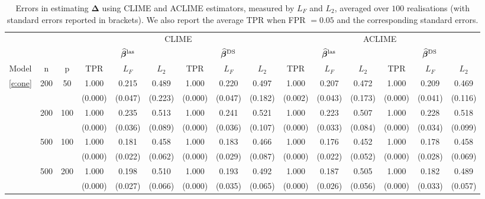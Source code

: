 \begin{table}[htbp]
\caption{Errors in estimating $\bm\Delta$ using CLIME and ACLIME estimators, measured by $L_F$ and $L_2$, averaged over $100$ realisations (with standard errors reported in brackets).
We also report the average TPR when FPR $= 0.05$ and the corresponding standard errors.} 
\label{table:lrpc:delta}
\centering
\resizebox{\columnwidth}{!}
{\scriptsize 
\begin{tabular}{ccc cccccc cccccc}
\toprule 
 &  &  & \multicolumn{6}{c}{CLIME} &  \multicolumn{6}{c}{ACLIME} \\
 \cmidrule(lr){4-9}\cmidrule(lr){10-15}
 &  &  & \multicolumn{3}{c}{$\widehat{\bm\beta}^{\text{\upshape{las}}}$} & \multicolumn{3}{c}{$\widehat{\bm\beta}^{\text{\upshape{DS}}}$} & \multicolumn{3}{c}{$\widehat{\bm\beta}^{\text{\upshape{las}}}$} & \multicolumn{3}{c}{$\widehat{\bm\beta}^{\text{\upshape{DS}}}$}   \\
 \cmidrule(lr){4-6}\cmidrule(lr){7-9} \cmidrule(lr){10-12} \cmidrule(lr){13-15}
Model & n & p & TPR & $L_F$ & $L_2$ & TPR & $L_F$ & $L_2$ & TPR & $L_F$ & $L_2$ & TPR & $L_F$ & $L_2$ \\
\cmidrule(lr){1-3}\cmidrule(lr){4-9} \cmidrule(lr){10-15}
\ref{e:one} & 200 & 50 & 1.000 & 0.215 & 0.489 & 1.000 & 0.220 & 0.497 & 1.000 & 0.207 & 0.472 & 1.000 & 0.209 & 0.469 \\
 &  &  & (0.000) & (0.047) & (0.223) & (0.000) & (0.047) & (0.182) & (0.002) & (0.043) & (0.173) & (0.000) & (0.041) & (0.116) \\
 & 200 & 100 & 1.000 & 0.235 & 0.513 & 1.000 & 0.241 & 0.521 & 1.000 & 0.223 & 0.507 & 1.000 & 0.228 & 0.518 \\
 &  &  & (0.000) & (0.036) & (0.089) & (0.000) & (0.036) & (0.107) & (0.000) & (0.033) & (0.084) & (0.000) & (0.034) & (0.099) \\
 & 500 & 100 & 1.000 & 0.181 & 0.458 & 1.000 & 0.183 & 0.466 & 1.000 & 0.176 & 0.452 & 1.000 & 0.178 & 0.458 \\
 &  &  & (0.000) & (0.022) & (0.062) & (0.000) & (0.029) & (0.087) & (0.000) & (0.022) & (0.052) & (0.000) & (0.028) & (0.069) \\
 & 500 & 200 & 1.000 & 0.198 & 0.510 & 1.000 & 0.193 & 0.492 & 1.000 & 0.187 & 0.505 & 1.000 & 0.182 & 0.489 \\
 &  &  & (0.000) & (0.027) & (0.066) & (0.000) & (0.035) & (0.065) & (0.000) & (0.026) & (0.056) & (0.000) & (0.033) & (0.057) \\	\cmidrule(lr){1-15}

\end{tabular}}
\end{table}
